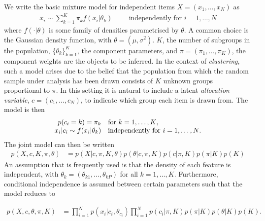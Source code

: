 \documentclass{bioinfo}
\begin{document}
We write the basic mixture model for independent items $X=(x_1, \ldots, x_N)$ as 
\begin{align}
x_i \sim \sum_{k=1}^K\pi_k f(x_i | \theta_k) \hspace{1cm} \textrm{independently for $i = 1,\ldots,N$}
\end{align}
where $f(\cdot| \theta)$ is some family of densities parametrised by $\theta$. A common choice is the Gaussian density function, with $\theta=(\mu, \sigma^2)$. $K$, the number of subgroups in the population, $\{\theta_k\}_{k=1}^K$, the component parameters, and $\pi=(\pi_1, \ldots, \pi_K)$, the component weights are the objects to be inferred. In the context of \emph{clustering}, such a model arises due to the belief that the population from which the random sample under analysis has been drawn consists of $K$ unknown groups proportional to $\pi$. In this setting it is natural to include a latent \emph{allocation variable}, $c=(c_1, \ldots, c_N)$, to indicate which group each item is drawn from. The model is then
\begin{equation}
	\label{eqn:mixModel}
	\begin{array}{r@{}l l}
		p(c_i = k) = \pi_k&  &\textrm{for $k = 1,\ldots,K$,} \\
		x_i | c_i \sim f(x_i | \theta_k)& &\textrm{independently for $i = 1,\ldots,N$.} 
	\end{array}
\end{equation}
The joint model can then be written
\begin{align}
	p(X, c, K, \pi, \theta) &= p(X | c, \pi, K, \theta) p(\theta | c, \pi, K) p(c | \pi, K) p(\pi | K) p(K) \nonumber
\end{align}
An assumption that is frequently used is that the density of each feature is independent, with $\theta_k=(\theta_{k1},\ldots, \theta_{kP})$ for all $k=1,\ldots,K$. Furthermore, conditional independence is assumed between certain parameters such that the model reduces to

\begin{align}
	p(X, c, \theta, \pi, K) &= \prod_{i=1}^N p(x_i | c_i, \theta_{c_i}) \prod_{i=1}^N p (c_i | \pi, K) p(\pi | K) p(\theta | K) p(K).  \label{eqn:jointMixModel}
\end{align}
\end{document}

